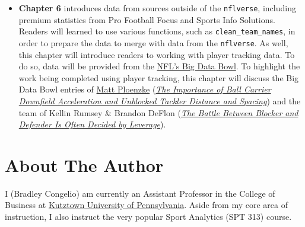 \documentclass[
  letterpaper,
]{krantz}
\begin{document}
\begin{itemize}
  (Silge, n.d.). As an example, readers will first be introduced to
  \href{https://twitter.com/tejfbanalytics}{Tej Seth's} Rushing Yards
  Over Expected model (\href{https://github.com/tejseth/RYOE}{GitHub},
  \href{https://mfbanalytics.shinyapps.io/RYOE/}{ShinyApp}). The model
  will serve as a learning tool to help readers understand the
  relationship between \texttt{nflfastR} data and machine learning (in
  Tej's case, an \texttt{xgboost} model). Afterward, specific attention
  is given to binary classification, multiclass classification, and
  regression computer learning models. At the conclusion of the chapter,
  readers will be provided exercises to allow them to develop their own
  supervised and unsupervised machine learning models.
\item
  \textbf{Chapter 6} introduces data from sources outside of the
  \texttt{nflverse}, including premium statistics from Pro Football
  Focus and Sports Info Solutions. Readers will learned to use various
  functions, such as \texttt{clean\_team\_names}, in order to prepare
  the data to merge with data from the \texttt{nflverse}. As well, this
  chapter will introduce readers to working with player tracking data.
  To do so, data will be provided from the
  \href{https://operations.nfl.com/gameday/analytics/big-data-bowl/}{NFL's
  Big Data Bowl}. To highlight the work being completed using player
  tracking, this chapter will discuss the Big Data Bowl entries of
  \href{https://twitter.com/MPloenzke}{Matt Ploenzke}
  (\href{https://operations.nfl.com/media/4204/bdb_ploenzke.pdf}{\emph{The
  Importance of Ball Carrier Downfield Acceleration and Unblocked
  Tackler Distance and Spacing}}) and the team of Kellin Rumsey \&
  Brandon DeFlon
  (\href{https://operations.nfl.com/media/4209/bdb_rumsey_deflon.pdf}{\emph{The
  Battle Between Blocker and Defender Is Often Decided by Leverage}}).
\end{itemize}

\hypertarget{about-the-author}{%
\section*{About The Author}\label{about-the-author}}

I (Bradley Congelio) am currently an Assistant Professor in the College
of Business at \href{https://www.kutztown.edu/}{Kutztown University of
Pennsylvania}. Aside from my core area of instruction, I also instruct
the very popular Sport Analytics (SPT 313) course.
\end{document}
